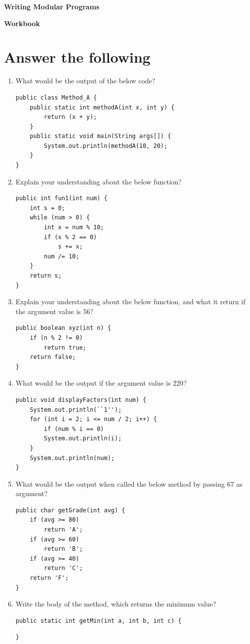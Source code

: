 \documentclass[11pt,a4paper]{article}
\def\AnswerBox{\fbox{\begin{minipage}{4in}\hfill\vspace{0.5in}\end{minipage}}}
\def\Answerbox{\fbox{\begin{minipage}{4in}\hfill\vspace{1.0in}\end{minipage}}}
\begin{document}
\centerline{\huge{ \textbf{Writing Modular Programs}}}
\vspace{1pc}
\centerline{\Large{ \textbf{Workbook}}}
\section*{Answer the following}

\begin{enumerate}
\item What would be the output of the below code?
\begin{lstlisting}
public class Method_A {
    public static int methodA(int x, int y) {
        return (x + y);
    }
    public static void main(String args[]) {
        System.out.println(methodA(10, 20); 
    }  
}
\end{lstlisting}
\AnswerBox

\item Explain your understanding about the below function?
\begin{lstlisting}
public int fun1(int num) {
    int s = 0;
    while (num > 0) {
        int x = num % 10;
        if (x % 2 == 0)
            s += x;
        num /= 10;
    }
    return s;
}
\end{lstlisting}
\AnswerBox

\item Explain your understanding about the below function, and what it return if the argument value is 56?
\begin{lstlisting}
public boolean xyz(int n) {
    if (n % 2 != 0)
        return true;
    return false;
}
\end{lstlisting}
\AnswerBox

\item What would be the output if the argument value is 220?
\begin{lstlisting}
public void displayFactors(int num) {
    System.out.println(``1'');
    for (int i = 2; i <= num / 2; i++) {
        if (num % i == 0) 
        System.out.println(i);
    }
    System.out.println(num);
}
\end{lstlisting}
\AnswerBox

\item What would be the output when called the below method by passing 67 as argument?
\begin{lstlisting}
public char getGrade(int avg) {
    if (avg >= 80)
        return 'A';
    if (avg >= 60)
        return 'B';
    if (avg >= 40)
        return 'C';
    return 'F';
}
\end{lstlisting}
\AnswerBox

\item Write the body of the method, which returns the minimum value?

\begin{lstlisting}[numbers=none]
public static int getMin(int a, int b, int c) {
\end{lstlisting}
\Answerbox
\begin{lstlisting}[numbers=none]
}
\end{lstlisting}
\end{enumerate}
\end{document}

